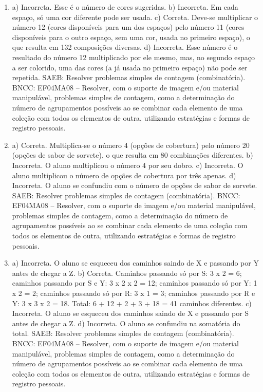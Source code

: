 \begin{enumerate}
\item
a) Incorreta. Esse é o número de cores sugeridas.
b) Incorreta. Em cada espaço, só uma cor diferente pode ser usada.
c) Correta. Deve-se multiplicar o número 12 (cores disponíveis para um dos espaços) pelo número 11 (cores disponíveis para o outro espaço, sem uma cor, usada no primeiro espaço), o que resulta em 132 composições diversas.
d) Incorreta. Esse número é o resultado do número 12 multiplicado por ele mesmo, mas, no segundo espaço a ser colorido, uma das cores (a já usada no primeiro espaço) não pode ser repetida.
SAEB: Resolver problemas simples de contagem (combinatória).
BNCC: EF04MA08 -- Resolver, com o suporte de imagem e/ou material manipulável, problemas simples
de contagem, como a determinação do número de agrupamentos possíveis ao se combinar cada
elemento de uma coleção com todos os elementos de outra, utilizando estratégias e formas de
registro pessoais.

\item
a) Correta. Multiplica-se o número 4 (opções de cobertura) pelo número 20 (opções de sabor de sorvete), o que resulta em 80 combinações diferentes.
b) Incorreta. O aluno multiplicou o número 4 por seu dobro.
c) Incorreta. O aluno multiplicou o número de opções de cobertura por três apenas.
d) Incorreta. O aluno se confundiu com o número de opções de sabor de sorvete.
SAEB: Resolver problemas simples de contagem (combinatória).
BNCC: EF04MA08 -- Resolver, com o suporte de imagem e/ou material manipulável, problemas simples
de contagem, como a determinação do número de agrupamentos possíveis ao se combinar cada
elemento de uma coleção com todos os elementos de outra, utilizando estratégias e formas de
registro pessoais.

\item
a) Incorreta. O aluno se esqueceu dos caminhos saindo de X e passando por Y antes de chegar a Z.
b) Correta. Caminhos passando só por S: 3 x 2 = 6; caminhos passando por S e Y: 3 x 2 x 2 = 12; caminhos passando só por Y: 1 x 2 = 2; caminhos passando só por R: 3 x 1 = 3; caminhos passando por R e Y: 3 x 3 x 2 = 18. Total: 6 + 12 + 2 + 3 + 18 = 41 caminhos diferentes.
c) Incorreta. O aluno se esqueceu dos caminhos saindo de X e passando por S antes de chegar a Z.
d) Incorreta. O aluno se confundiu na somatória do total.
SAEB: Resolver problemas simples de contagem (combinatória).
BNCC: EF04MA08 -- Resolver, com o suporte de imagem e/ou material manipulável, problemas simples
de contagem, como a determinação do número de agrupamentos possíveis ao se combinar cada
elemento de uma coleção com todos os elementos de outra, utilizando estratégias e formas de
registro pessoais.
\end{enumerate}

